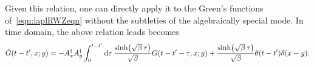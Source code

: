 \documentclass[reprint,aps,physrev,superscriptaddress,10pt,notitlepage,prd,nofootinbib,onecolumn]{revtex4-2}
\newcommand{\rd}{{\rm d}}
\begin{document}
Given this relation, one can directly apply it to the Green's functions of~\eqref{eqn:laplRWZeqn} without the subtleties of the algebraically special mode. In time domain, the above relation leads becomes
\begin{align}
    \tilde{G}(t-t',x;y) = -A^\dagger_x  A^\dagger_y \int_0^{t-t'}\rd \tau \,\frac{\sinh(\sqrt{\beta} \,\tau )}{\sqrt{\beta}}G(t-t'-\tau,x;y) + \frac{\sinh(\sqrt{\beta} \,\tau )}{\sqrt{\beta}}\theta(t-t')\delta(x-y) .
\end{align}




%

\end{document}
